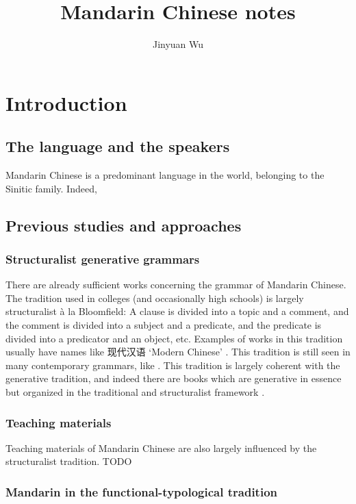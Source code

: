 \documentclass[UTF8, a4paper, oneside, scheme=plain, 12pt]{ctexrep}
\title{Mandarin Chinese notes}
\author{Jinyuan Wu}
\newcommand{\ala}{à la}
\newcommand{\translate}[1]{`#1'}
\begin{document}
\maketitle

\automath

\chapter{Introduction}

\section{The language and the speakers}

Mandarin Chinese is a predominant language in the world,
belonging to the Sinitic family.
Indeed,  

\section{Previous studies and approaches}

\subsection{Structuralist generative grammars}\label{sec:previous.structuralist}

There are already sufficient works concerning the grammar of Mandarin Chinese.
The tradition used in colleges (and occasionally high schools) 
is largely structuralist \ala{} Bloomfield:
A clause is divided into a topic and a comment,
and the comment is divided into a subject and a predicate,
and the predicate is divided into a predicator and an object, etc.
Examples of works in this tradition usually have names like 现代汉语 \translate{Modern Chinese}
\citep{xianhan2004}.
This tradition is still seen in many contemporary grammars,
like \citet{cgel}.
This tradition is largely coherent with the generative tradition,
and indeed there are books which are generative in essence 
but organized in the traditional and structuralist framework \citep{deng2010formal}.

\subsection{Teaching materials}

Teaching materials of Mandarin Chinese are also largely influenced by the structuralist tradition.
TODO

\subsection{Mandarin in the functional-typological tradition}
\end{document}
